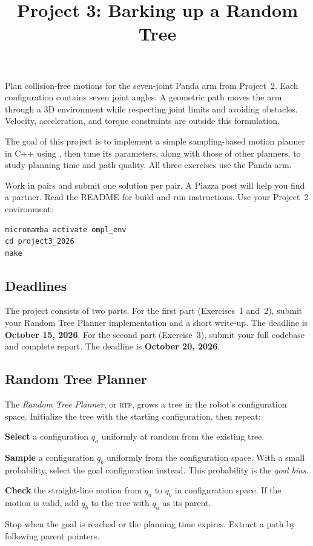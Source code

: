 \documentclass{comp450}
\title{Project 3: Barking up a Random Tree}
\author{}
\begin{document}
\maketitle
\ompldocinfo

Plan collision-free motions for the seven-joint Panda arm from Project~2.
Each configuration contains seven joint angles.
A geometric path moves the arm through a 3D environment while respecting joint limits and avoiding obstacles.
Velocity, acceleration, and torque constraints are outside this formulation.

The goal of this project is to implement a simple sampling-based motion planner in C++ using \ompl, then tune its parameters, along with those of other planners, to study planning time and path quality.
All three exercises use the Panda arm.

Work in pairs and submit one solution per pair.
A Piazza post will help you find a partner.
Read the README for build and run instructions.
Use your Project~2 environment:
\vspace*{-0.5\baselineskip}
\begin{verbatim}
micromamba activate ompl_env
cd project3_2026
make
\end{verbatim}
\vspace*{-0.5\baselineskip}

\subsection*{Deadlines}
The project consists of two parts.
For the first part (Exercises~1 and~2), submit your Random Tree Planner implementation and a short write-up.
The deadline is \textbf{October 15, 2026}.
For the second part (Exercise~3), submit your full codebase and complete report.
The deadline is \textbf{October 20, 2026}.

\subsection*{Random Tree Planner}
The \emph{Random Tree Planner}, or \textsc{rtp}, grows a tree in the robot's configuration space.
Initialize the tree with the starting configuration, then repeat:
\begin{enumerate*}
\vspace*{-\baselineskip}
    \item \textbf{Select} a configuration $q_a$ uniformly at random from the existing tree.
    \item \textbf{Sample} a configuration $q_b$ uniformly from the configuration space.
    With a small probability, select the goal configuration instead.
    This probability is the \emph{goal bias}.
    \item \textbf{Check} the straight-line motion from $q_a$ to $q_b$ in configuration space.
    If the motion is valid, add $q_b$ to the tree with $q_a$ as its parent.
    \item Stop when the goal is reached or the planning time expires.
    Extract a path by following parent pointers.
\end{enumerate*}
\vspace*{-\baselineskip}
\end{document}
